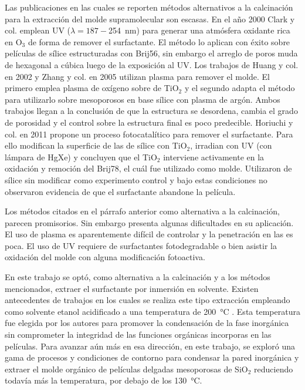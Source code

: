	Las publicaciones en las cuales se reporten métodos alternativos a la calcinación para la extracción del molde supramolecular son escasas. En el año 2000 Clark y col.\cite{Clark2000} emplean UV ($\lambda=187-$\SI{254}{\nm}) para generar una atmósfera oxidante rica en O$_3$ de forma de remover el surfactante. El método lo aplican con éxito sobre películas de sílice estructuradas con Brij56, sin embargo el arreglo de poros muda de hexagonal a cúbica luego de la exposición al UV. Los trabajos de Huang y col. en 2002\cite{Huang2002} y Zhang y col. en 2005\cite{Zhang2005} utilizan plasma para remover el molde. El primero emplea plasma de oxígeno sobre \pdm\space de TiO$_2$ y el segundo adapta el método para utilizarlo sobre mesoporosos en base sílice con plasma de argón. Ambos trabajos llegan a la conclusión de que la estructura se desordena, cambia el grado de porosidad y el control sobre la estructura final es poco predecible. Horiuchi y col.\cite{Horiuchi2011} en 2011 propone un proceso fotocatalítico para remover el surfactante. Para ello modifican la superficie de las \pdm\space de sílice con TiO$_2$, irradian con UV (con lámpara de HgXe) y concluyen que el TiO$_2$ interviene activamente en la oxidación y remoción del Brij78, el cuál fue utilizado como molde. Utilizaron \pdm\space de sílice sin modificar como experimento control y bajo estas condiciones no observaron evidencia de que el surfactante abandone la película.

	Los métodos citados en el párrafo anterior como alternativa a la calcinación, parecen promisorios. Sin embargo presenta algunas dificultades en su aplicación. El uso de plasma es aparentemente difícil de controlar y la penetración en las \pdm\space es poca. El uso de UV requiere de surfactantes fotodegradable o bien asistir la oxidación del molde con alguna modificación fotoactiva.

	En este trabajo se optó, como alternativa a la calcinación y a los métodos mencionados, extraer el surfactante por inmersión en solvente. Existen antecedentes de trabajos en los cuales se realiza este tipo extracción empleando como solvente etanol acidificado a una temperatura de \SI{200}{\celsius} \cite{Angelome2008,Calvo20210,Calvo2010,Fuertes2009}. Esta temperatura fue elegida por los autores para promover la condensación de la fase inorgánica sin comprometer la integridad de las funciones orgánicas incorporas en las películas. Para avanzar aún más en esa dirección, en este trabajo, se exploró una gama de procesos y condiciones de contorno para condensar la pared inorgánica y extraer el molde orgánico de películas delgadas mesoporosas de SiO$_2$ reduciendo todavía más la temperatura, por debajo de los \SI{130}{\celsius}.

